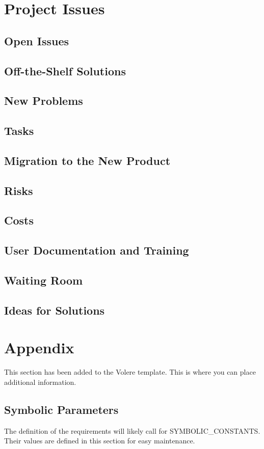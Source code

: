 \documentclass[12pt, titlepage]{article}
\begin{document}
\section{Project Issues}
\subsection{Open Issues}
\subsection{Off-the-Shelf Solutions}
\subsection{New Problems}
\subsection{Tasks}
\subsection{Migration to the New Product}
\subsection{Risks}
\subsection{Costs}
\subsection{User Documentation and Training}
\subsection{Waiting Room}
\subsection{Ideas for Solutions}


\newpage
\section{Appendix}
This section has been added to the Volere template.  This is where you can place
additional information.
\subsection{Symbolic Parameters}
The definition of the requirements will likely call for SYMBOLIC\_CONSTANTS.
Their values are defined in this section for easy maintenance.
\end{document}
